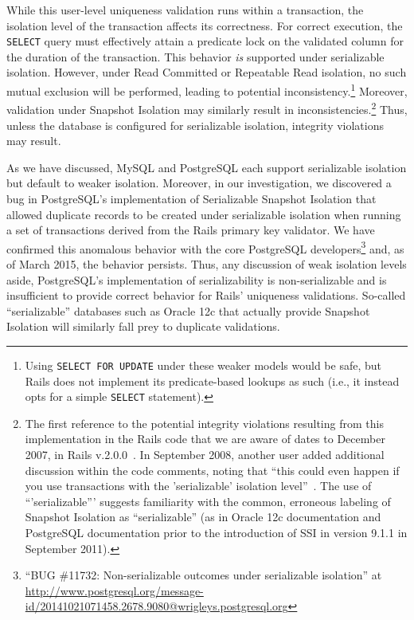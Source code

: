 While this user-level uniqueness validation runs within a transaction,
the isolation level of the transaction affects its
correctness. For correct execution, the \texttt{SELECT} query must
effectively attain a predicate lock on the validated column for the
duration of the transaction. This behavior \textit{is} supported under
serializable isolation. However, under Read Committed or Repeatable
Read isolation, no such mutual exclusion will be performed, leading to
potential inconsistency.\footnote{Using \texttt{SELECT FOR UPDATE}
  under these weaker models would be safe, but Rails does not
  implement its predicate-based lookups as such (i.e., it instead opts
  for a simple \texttt{SELECT} statement).}  Moreover, validation under Snapshot Isolation
may similarly result in
inconsistencies.\footnote{The first reference to the potential integrity
  violations resulting from this implementation in the Rails code that
  we are aware of dates to December 2007, in Rails
  v.2.0.0~\cite{code-unique-race-one}.  In September 2008, another
  user added additional discussion within the code comments, noting
  that ``this could even happen if you use transactions with the
  'serializable' isolation
  level''~\cite{code-unique-race-two}. The use of ``'serializable''' suggests familiarity with the
  common, erroneous labeling of Snapshot Isolation as ``serializable''
  (as in Oracle 12c documentation and PostgreSQL documentation prior
  to the introduction of SSI in version 9.1.1 in September
  2011)\label{fn:si-rails}. } Thus, unless the database is configured
for serializable isolation, integrity violations may result.

As we have discussed, MySQL and PostgreSQL each support serializable
isolation but default to weaker isolation. Moreover, in our
investigation, we discovered a bug in PostgreSQL's implementation of
Serializable Snapshot Isolation that allowed duplicate records to be
created under serializable isolation when running a set of
transactions derived from the Rails primary key validator. We have
confirmed this anomalous behavior with the core PostgreSQL
developers\footnote{``BUG \#11732: Non-serializable outcomes under
  serializable isolation'' at
  \url{http://www.postgresql.org/message-id/20141021071458.2678.9080@wrigleys.postgresql.org}\label{fn:pg-bug}}
and, as of March 2015, the behavior persists. Thus, any discussion of
weak isolation levels aside, PostgreSQL's implementation of
serializability is non-serializable and is insufficient to provide
correct behavior for Rails' uniqueness validations. So-called
``serializable'' databases such as Oracle 12c that actually provide
Snapshot Isolation will similarly fall prey to duplicate validations.

